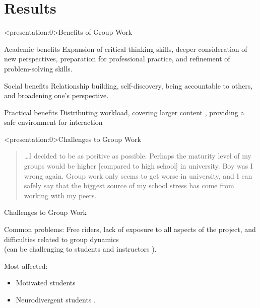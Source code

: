\documentclass[12pt,table,aspectratio=169]{beamer}
\begin{document}
\section{Results}

\begin{frame}<presentation:0>{Benefits of Group Work \cite{lee2015, concordia}}
        \begin{alertblock}{Academic benefits}
        \small Expansion of critical thinking skills, deeper consideration of new perspectives, preparation for professional practice, and refinement of problem-solving skills.
        \end{alertblock}
        \begin{alertblock}{Social benefits}
        \small Relationship building, self-discovery, being accountable to others, and broadening one's perspective.
        \end{alertblock}
        \begin{alertblock}{Practical benefits}
        \small Distributing workload, covering larger content%
        ,  providing a safe environment for interaction%
    \end{alertblock}
\end{frame}

\begin{frame}<presentation:0>{Challenges to Group Work}
\begin{quote}
    \dots I decided to be as positive as possible. Perhaps the maturity level of my groups would be higher [compared to high school] in university. Boy was I wrong again. Group work only seems to get worse in university, and I can safely say that the biggest source of my school stress has come from working with my peers. \cite{macleans}
\end{quote}
\end{frame}

\begin{frame}{Challenges to Group Work}
    \begin{alertblock}{Common problems:}
        Free riders, lack of exposure to all aspects of the project, and difficulties related to group dynamics \cite{chapman2006}\\(can be challenging to students and instructors \cite{facultyfocus2}).
    \end{alertblock}
    \vspace{1em}
    \begin{alertblock}{Most affected:}
    \addtolength{\leftmargini}{\labelsep}
        \begin{itemize}
            \item Motivated students \cite{lee2015}
            \item Neurodivergent students \cite{helping}.
        \end{itemize}
    \end{alertblock}
\end{frame}
\end{document}
